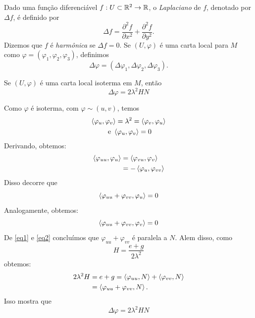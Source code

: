 \begin{definicao}
	Dado uma função diferenciável $f: U \subset \mathbb{R}^2 \rightarrow \mathbb{R}$, o \emph{Laplaciano} de $f$, denotado por $\Delta f$, é definido por
	\begin{equation*}
	\Delta f = \frac{\partial^2 f}{\partial x^2} + \frac{\partial^2 f}{\partial y^2}.
	\end{equation*}
	Dizemos que $f$ é \emph{harmônica} se $\Delta f = 0$.
	Se $(U, \varphi)$ é uma carta local para $M$ como $\varphi = (\varphi_1, \varphi_2, \varphi_3)$, definimos
	\begin{equation*}
	\Delta \varphi = (\Delta \varphi_1, \Delta \varphi_2, \Delta \varphi_3).
	\end{equation*}
\end{definicao}

\begin{proposicao}
	Se $(U, \varphi)$ é uma carta local isoterma em $M$, então 
	\begin{equation*}
	\Delta \varphi = 2 \lambda^2 H N
	\end{equation*}
\end{proposicao}

\begin{demonstracao}
	Como $\varphi$ é isoterma, com $\varphi \sim (u, v)$, temos
	\begin{gather*}
	\left\langle \varphi_u,\varphi_v \right\rangle = \lambda^2 = \left\langle \varphi_v,\varphi_u \right\rangle \\
	\text{ e } \left\langle \varphi_u,\varphi_v \right\rangle = 0
	\end{gather*}
	Derivando, obtemos:
	\begin{align*}
	\left\langle \varphi_{uu},\varphi_u \right\rangle &= \left\langle \varphi_{vu},\varphi_v \right\rangle\\
	&= - \left\langle \varphi_u,\varphi_{vv} \right\rangle
	\end{align*}
	Disso decorre que
	\begin{equation}\label{eq1}
	\left\langle \varphi_{uu} + \varphi_{vv},\varphi_u \right\rangle = 0
	\end{equation}
	Analogamente, obtemos:
	\begin{equation}\label{eq2}
	\left\langle \varphi_{uu} + \varphi_{vv},\varphi_v \right\rangle = 0
	\end{equation}
	De \eqref{eq1} e \eqref{eq2} concluímos que $\varphi_{uu} + \varphi_{vv}$ é paralela a $N$. Alem disso, como
	\begin{equation}
	H = \frac{e+g}{2 \lambda^2}
	\end{equation}
	obtemos:
	\begin{align*}
	2 \lambda^2 H &= e + g = \left\langle \varphi_{uu},N \right\rangle + \left\langle \varphi_{vv},N \right\rangle\\
	&= \left\langle \varphi_{uu} + \varphi_{vv},N \right\rangle.
	\end{align*}
	Isso mostra que
	\begin{equation}
	\Delta \varphi = 2 \lambda^2 H N
	\end{equation}
\end{demonstracao}

